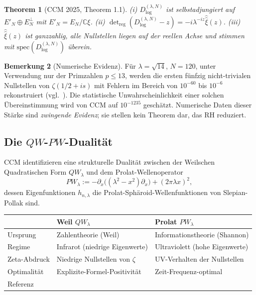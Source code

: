 \documentclass[11pt,a4paper]{article}
\theoremstyle{plain}
\newtheorem{theorem}{Theorem}[section]
\theoremstyle{definition}
\newtheorem{remark}[theorem]{Bemerkung}
\newcommand{\C}{\mathbb{C}}
\begin{document}
\begin{theorem}[CCM 2025, Theorem 1.1]\label{thm:ccm-mainthm}
(i) $D^{(\lambda,N)}_{\log}$ ist selbstadjungiert auf $E'_N \oplus
E_N^\perp$ mit $E'_N = E_N/\C\xi$.
(ii) $\det_{\mathrm{reg}}(D^{(\lambda,N)}_{\log} - z) = -i
\lambda^{-iz}\widehat{\widehat\xi}(z)$.
(iii) $\widehat{\widehat\xi}(z)$ ist ganzzahlig, alle Nullstellen liegen auf der
reellen Achse und stimmen mit $\mathrm{spec}(D^{(\lambda,N)}_{\log})$ überein.
\end{theorem}

\begin{remark}[Numerische Evidenz]\label{rem:ccm-numerics}
Für $\lambda = \sqrt{14}$, $N = 120$, unter Verwendung nur der Primzahlen
$p \leq 13$, werden die ersten fünfzig nicht-trivialen Nullstellen von $\zeta(1/2+is)$
mit Fehlern im Bereich von $10^{-60}$ bis $10^{-6}$ rekonstruiert
(vgl.~\cite[Table~1]{ConnesConsaniMoscovici2025}). Die statistische
Unwahrscheinlichkeit einer solchen Übereinstimmung wird von CCM auf
$10^{-1235}$ geschätzt. Numerische Daten dieser Stärke sind \emph{zwingende Evidenz};
sie stellen kein Theorem dar, das RH reduziert.
\end{remark}

\subsection{Die $QW$-$PW$-Dualität}
\label{sec:ccm-duality}

CCM identifizieren eine strukturelle Dualität zwischen der Weilschen
Quadratischen Form $QW_\lambda$ und dem Prolat-Wellenoperator
\[
  PW_\lambda := -\partial_x\big((\lambda^2-x^2)\partial_x\big) +
    (2\pi\lambda x)^2,
\]
dessen Eigenfunktionen $h_{n,\lambda}$ die Prolat-Sphäroid-Wellenfunktionen
von Slepian-Pollak \cite{SlepianPollack1961} sind.

\begin{center}
\small
\begin{tabular}{@{}lll@{}}
\toprule
& \textbf{Weil $QW_\lambda$} & \textbf{Prolat $PW_\lambda$} \\
\midrule
Ursprung        & Zahlentheorie (Weil) & Informationstheorie (Shannon) \\
Regime          & Infrarot (niedrige Eigenwerte) & Ultraviolett (hohe Eigenwerte)\\
Zeta-Abdruck    & Niedrige Nullstellen von $\zeta$ & UV-Verhalten der Nullstellen\\
Optimalität     & Explizite-Formel-Positivität & Zeit-Frequenz-optimal \\
Referenz        & \cite{ConnesConsaniMoscovici2025} & \cite{ConnesMoscovici2022} \\
\bottomrule
\end{tabular}
\end{center}
\end{document}
